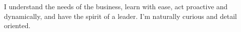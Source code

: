 


\small
I understand the needs of the business, learn with ease, act proactive and dynamically, 
and have the spirit of a leader. I'm naturally curious and detail oriented.
